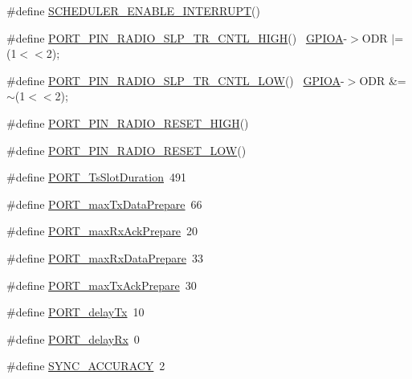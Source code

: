 \begin{DoxyCompactItemize}
\item 
\#define \hyperlink{iot-lab___m3_2board__info_8h_a629721de419fa273ad4a7d63e38060a1}{S\+C\+H\+E\+D\+U\+L\+E\+R\+\_\+\+E\+N\+A\+B\+L\+E\+\_\+\+I\+N\+T\+E\+R\+R\+U\+PT}()            
\item 
\#define \hyperlink{iot-lab___m3_2board__info_8h_a0c94ab822e20845b464e5e57d9e921ac}{P\+O\+R\+T\+\_\+\+P\+I\+N\+\_\+\+R\+A\+D\+I\+O\+\_\+\+S\+L\+P\+\_\+\+T\+R\+\_\+\+C\+N\+T\+L\+\_\+\+H\+I\+GH}()      ~\hyperlink{group___peripheral__declaration_gac485358099728ddae050db37924dd6b7}{G\+P\+I\+OA}-\/$>$O\+DR $\vert$= (1$<$$<$2);
\item 
\#define \hyperlink{iot-lab___m3_2board__info_8h_ac5ffe05e057c8ef9e409c9f694d6c0ed}{P\+O\+R\+T\+\_\+\+P\+I\+N\+\_\+\+R\+A\+D\+I\+O\+\_\+\+S\+L\+P\+\_\+\+T\+R\+\_\+\+C\+N\+T\+L\+\_\+\+L\+OW}()        ~\hyperlink{group___peripheral__declaration_gac485358099728ddae050db37924dd6b7}{G\+P\+I\+OA}-\/$>$O\+DR \&= $\sim$(1$<$$<$2);
\item 
\#define \hyperlink{iot-lab___m3_2board__info_8h_af4a130f509ad3aa6287a1a21d393a91e}{P\+O\+R\+T\+\_\+\+P\+I\+N\+\_\+\+R\+A\+D\+I\+O\+\_\+\+R\+E\+S\+E\+T\+\_\+\+H\+I\+GH}()          
\item 
\#define \hyperlink{iot-lab___m3_2board__info_8h_a3946c37e363c4de9a256eb6c772e95bb}{P\+O\+R\+T\+\_\+\+P\+I\+N\+\_\+\+R\+A\+D\+I\+O\+\_\+\+R\+E\+S\+E\+T\+\_\+\+L\+OW}()            
\item 
\#define \hyperlink{iot-lab___m3_2board__info_8h_a753468943519d7d3ed61ea7134df2f11}{P\+O\+R\+T\+\_\+\+Ts\+Slot\+Duration}~491
\item 
\#define \hyperlink{iot-lab___m3_2board__info_8h_af45f329a1d2c1097af1d022b6363b0ed}{P\+O\+R\+T\+\_\+max\+Tx\+Data\+Prepare}~66
\item 
\#define \hyperlink{iot-lab___m3_2board__info_8h_a238f21ff0cb8bed569124960f22f882e}{P\+O\+R\+T\+\_\+max\+Rx\+Ack\+Prepare}~20
\item 
\#define \hyperlink{iot-lab___m3_2board__info_8h_a9e21d179374e68398446ff4353ad8318}{P\+O\+R\+T\+\_\+max\+Rx\+Data\+Prepare}~33
\item 
\#define \hyperlink{iot-lab___m3_2board__info_8h_a8c4fcdb6e44dcf5103f7f727b2cf42b8}{P\+O\+R\+T\+\_\+max\+Tx\+Ack\+Prepare}~30
\item 
\#define \hyperlink{iot-lab___m3_2board__info_8h_ad5778702c9656470618b2d8c1c82423a}{P\+O\+R\+T\+\_\+delay\+Tx}~10
\item 
\#define \hyperlink{iot-lab___m3_2board__info_8h_a26ca518d2e84908d5486fe5d5d384f52}{P\+O\+R\+T\+\_\+delay\+Rx}~0
\item 
\#define \hyperlink{iot-lab___m3_2board__info_8h_a190d1e774c272ae302ed98c400694f9a}{S\+Y\+N\+C\+\_\+\+A\+C\+C\+U\+R\+A\+CY}~2
\end{DoxyCompactItemize}


